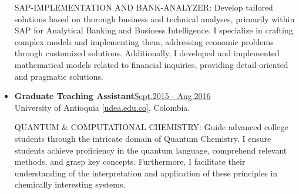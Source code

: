 \begin{itemize}
              {\noindent
                  \uppercase{SAP-Implementation and Bank-Analyzer:}
                  Develop tailored solutions based on thorough business and technical analyses, primarily within SAP for Analytical Banking and Business Intelligence. I specialize in crafting complex models and implementing them, addressing economic problems through customized solutions. Additionally, I developed and implemented mathematical models related to financial inquiries, providing detail-oriented and pragmatic solutions.
              }

    \item {\bf Graduate Teaching Assistant}\hfill \href{.}{Sept.2015 - Aug.2016}\\
          University of Antioquia [\href{www.udea.edu.co}{udea.edu.co}],
          Colombia.

              {\noindent
                  \uppercase{Quantum \& Computational Chemistry:}
                  Guide advanced college students through the intricate domain of Quantum Chemistry. I ensure students achieve proficiency in the quantum language, comprehend relevant methods, and grasp key concepts. Furthermore, I facilitate their understanding of the interpretation and application of these principles in chemically interesting systems.
              }

\end{itemize}
